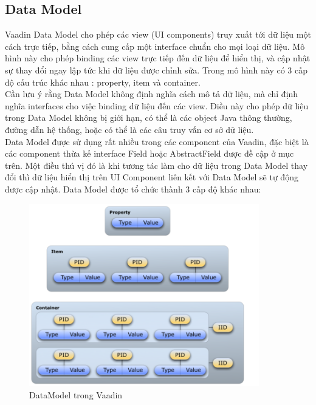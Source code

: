 \subsection{Data Model}
Vaadin Data Model cho phép các view (UI components) truy xuất tới dữ liệu một cách trực tiếp, bằng cách cung cấp một interface chuẩn cho mọi loại dữ liệu. Mô hình này cho phép binding các view trực tiếp đến dữ liệu để hiển thị, và cập nhật sự thay đổi ngay lập tức khi dữ liệu được chỉnh sửa. Trong mô hình này có 3 cấp độ cấu trúc khác nhau : property, item và container.
\\
Cần lưu ý rằng Data Model không định nghĩa cách mô tả dữ liệu, mà chỉ định nghĩa interfaces cho việc binding dữ liệu đến các view. Điều này cho phép dữ liệu trong Data Model không bị giới hạn, có thể là các object Java thông thường, đường dẫn hệ thống, hoặc có thể là các câu truy vấn cơ sở dữ liệu.
\\
Data Model được sử dụng rất nhiều trong các component của Vaadin, đặc biệt là các component thừa kế interface Field hoặc AbstractField được đề cập ở mục trên. Một điều thú vị đó là khi tương tác làm cho dữ liệu trong Data Model thay đổi thì dữ liệu hiển thị trên UI Component liên kết với Data Model sẽ tự động được cập nhật. Data Model được tổ chức thành 3 cấp độ khác nhau:
\begin{figure}[h!]
	\centering
	\includegraphics[width=100mm]{Figures/vaadin_datamodel.png}
	\caption{DataModel trong Vaadin\label{overflow}}
\end{figure}

